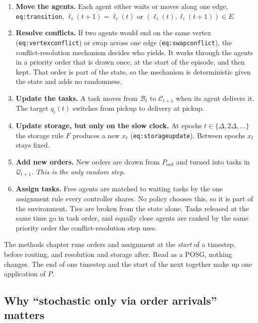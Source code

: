 \documentclass[11pt,a4paper]{article}
\begin{document}
\begin{enumerate}[label=(\alph*),leftmargin=*]
  \item \textbf{Move the agents.} Each agent either waits or moves along
        one edge, \texttt{eq:transition}, $\ell_i(t+1) = \ell_i(t)$ or
        $(\ell_i(t),\ell_i(t+1)) \in E$.
  \item \textbf{Resolve conflicts.} If two agents would end on the same
        vertex (\texttt{eq:vertexconflict}) or swap across one edge
        (\texttt{eq:swapconflict}), the conflict-resolution mechanism
        decides who yields. It works through the agents in a priority
        order that is drawn once, at the start of the episode, and then
        kept. That order is part of the state, so the mechanism is
        deterministic given the state and adds no randomness.
  \item \textbf{Update the tasks.} A task moves from $\mathcal{B}_t$ to
        $\mathcal{C}_{t+1}$ when its agent delivers it. The target
        $q_i(t)$ switches from pickup to delivery at pickup.
  \item \textbf{Update storage, but only on the slow clock.} At epochs
        $t \in \{\Delta, 2\Delta,\dots\}$ the storage rule $F$ produces
        a new $x_t$ (\texttt{eq:storageupdate}). Between epochs $x_t$
        stays fixed.
  \item \textbf{Add new orders.} New orders are drawn from
        $P_{\mathrm{ord}}$ and turned into tasks in $\mathcal{Q}_{t+1}$.
        \emph{This is the only random step.}
  \item \textbf{Assign tasks.} Free agents are matched to waiting tasks by
        the one assignment rule every controller shares. No policy chooses
        this, so it is part of the environment. Ties are broken from the
        state alone. Tasks released at the same time go in task order, and
        equally close agents are ranked by the same priority order the
        conflict-resolution step uses.
\end{enumerate}

\noindent The methods chapter runs orders and assignment at the
\emph{start} of a timestep, before routing, and resolution and storage
after. Read as a POSG, nothing changes. The end of one timestep and the
start of the next together make up one application of $P$.

\subsection{Why ``stochastic only via order arrivals'' matters}
\end{document}
